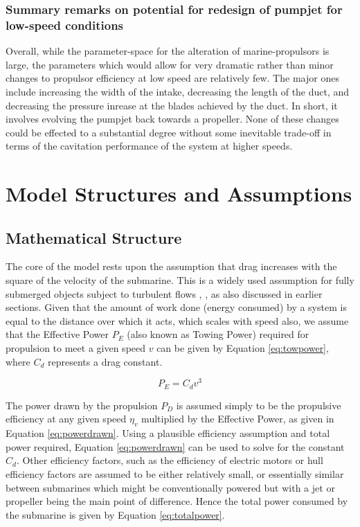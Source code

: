 \documentclass{article}\usepackage[]{graphicx}\usepackage[]{color}
\begin{document}
\subsubsection{Summary remarks on potential for redesign of pumpjet for low-speed conditions}
Overall, while the parameter-space for the alteration of marine-propulsors is large, the parameters which would allow for very dramatic rather than minor changes to propulsor efficiency at low speed are relatively few.  The major ones include increasing the width of the intake, decreasing the length of the duct, and decreasing the pressure inrease at the blades achieved by the duct.  In short, it involves evolving the pumpjet back towards a propeller.  None of these changes could be effected to a substantial degree without some inevitable trade-off in terms of the cavitation performance of the system at higher speeds.

\section{Model Structures and Assumptions}

\subsection{Mathematical Structure}

The core of the model rests upon the assumption that drag increases with the square of the velocity of the submarine.  This is a widely used assumption for fully submerged objects subject to turbulent flows \parencite[5]{wislicenus1973}, \parencite{davies2017}, as also discussed in earlier sections. Given that the amount of work done (energy consumed) by a system is equal to the distance over which it acts, which scales with speed also, we assume that the Effective Power $P_E$ (also known as Towing Power) required for propulsion to meet a given speed $v$ can be given by Equation \ref{eq:towpower}, where $C_d$ represents a drag constant.

\begin{equation}
\label{eq:towpower}
P_E = C_dv^3
\end{equation}

The power drawn by the propulsion $P_D$ is assumed simply to be the propulsive efficiency at any given speed $\eta_v$ multiplied by the Effective Power, as given in Equation \ref{eq:powerdrawn}.  Using a plausible efficiency assumption and total power required, Equation \ref{eq:powerdrawn} can be used to solve for the constant $C_d$.  Other efficiency factors, such as the efficiency of electric motors or hull efficiency factors are assumed to be either relatively small, or essentially similar between submarines which might be conventionally powered but with a jet or propeller being the main point of difference.  Hence the total power consumed by the submarine is given by Equation \ref{eq:totalpower}.
\end{document}
